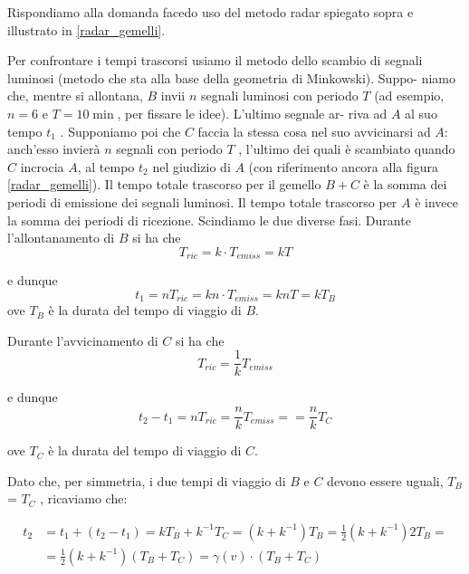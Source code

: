 Rispondiamo alla domanda facedo uso del metodo radar spiegato sopra e illustrato 
in \ref{radar_gemelli}.

Per confrontare i tempi trascorsi usiamo il metodo dello scambio di segnali
luminosi (metodo che sta alla base della geometria di Minkowski). Suppo-
niamo che, mentre si allontana, $B$ invii $n$ segnali luminosi con periodo $T$
(ad esempio, $n = 6$ e $T = 10 \min$, per fissare le idee). L'ultimo segnale ar-
riva ad $A$ al suo tempo $t_1$ . Supponiamo poi che $C$ faccia la stessa cosa nel
suo avvicinarsi ad $A$: anch'esso invierà $n$ segnali con periodo $T$ , l'ultimo dei
quali è scambiato quando $C$ incrocia $A$, al tempo $t_2$ nel giudizio di $A$ (con
riferimento ancora alla figura \ref{radar_gemelli}).
Il tempo totale trascorso per il gemello $B + C$ è la somma dei periodi di
emissione dei segnali luminosi. Il tempo totale trascorso per $A$ è invece la
somma dei periodi di ricezione. Scindiamo le due diverse fasi.
Durante l'allontanamento di $B$ si ha che
\begin{equation}
T_{ric} = k \cdot T_{emiss} = kT 
\end{equation}

e dunque
\begin{equation}
 t_1 = nT_{ric} = kn \cdot T_{emiss} = knT = kT_B
\end{equation}
ove $T_B$ è la durata del tempo di viaggio di $B$.

Durante l'avvicinamento di $C$ si ha che
\begin{equation}
T_{ric} = \frac{1}{k} T_{emiss}
\end{equation}

e dunque
\begin{equation}
t_2 - t_1 = n T_{ric} = \frac{n}{k} T_{emiss} = = \frac{n}{k} T_{C}  
\end{equation}

ove $T_C$ è la durata del tempo di viaggio di $C$.

Dato che, per simmetria, i due tempi di viaggio di $B$ e $C$ devono essere
uguali, $T_B$ = $T_C$ , ricaviamo che:

\begin{equation}
\begin{split}
t_2 &= t_1 + (t_2 - t_1 ) = kT_B + k^{-1} T_C = (k + k ^{- 1})T_B = \frac{1}{2}(k + k^{- 1})2 T_B = \\
&= \frac{1}{2} (k + k^{-1})(T_B + T_C ) = \gamma(v) \cdot (T_B + T_C )
\end{split}
\end{equation}

